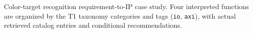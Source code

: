 \documentclass[10pt]{article}
\begin{document}

\par\smallskip
{\fontsize{8}{9.5}\selectfont
\raggedright\noindent
Color-target recognition requirement-to-IP case study. Four interpreted functions
are organized by the T1 taxonomy categories and tags (\texttt{io}, \texttt{axi}),
with actual retrieved catalog entries and conditional recommendations.\par}
\end{document}
